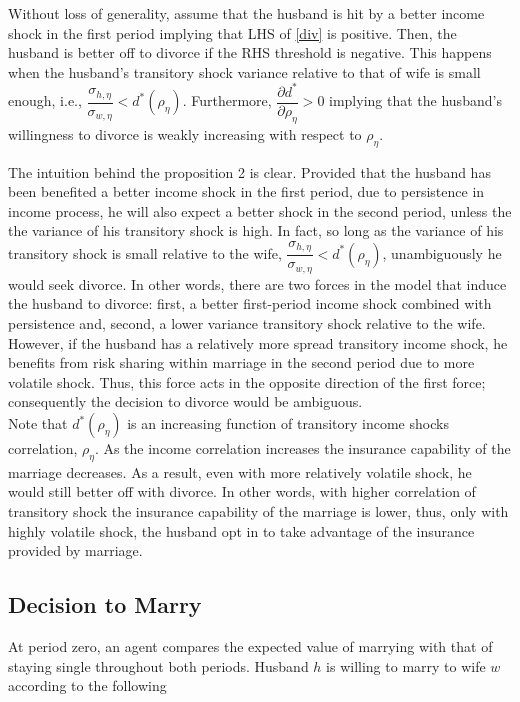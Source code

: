 \begin{prop}
Without loss of generality, assume that the husband is hit by a better income shock in the first period implying that LHS of \eqref{div} is positive. Then, the husband is better off to divorce if the RHS threshold is negative. This happens when the husband's transitory shock variance relative to that of wife is small enough, i.e.,  \( \dfrac{\sigma_{h, \eta}}{\sigma_{w,\eta} } < d^*(\rho_\eta)\). Furthermore,  \( \dfrac{\partial d^*}{\partial \rho_{\eta}} > 0\) implying that the husband's willingness to divorce is weakly increasing with respect to $\rho_\eta$.  
\end{prop}

The intuition behind the proposition 2 is clear. Provided that the husband has been benefited a better income shock in the first period, due to persistence in income process, he will also expect a better shock in the second period, unless the the variance of his transitory shock is high. In fact, so long as the variance of his transitory shock is small relative to the wife,  \( \dfrac{\sigma_{h, \eta}}{\sigma_{w,\eta} } < d^*(\rho_\eta)\), unambiguously he would seek divorce. In other words, there are two forces in the model that induce the husband to divorce: first, a better first-period income shock combined with persistence and, second, a lower variance transitory shock relative to the wife. However, if the husband has a relatively more spread transitory income shock, he benefits from risk sharing within marriage in the second period due to more volatile shock. Thus, this force acts in the opposite direction of the first force; consequently the decision to divorce would be ambiguous.  \\

Note that $d^*(\rho_\eta)$ is an increasing function of transitory income shocks correlation, $\rho_\eta$.  As the income correlation increases the insurance capability of the marriage decreases. As a result, even with more relatively volatile shock, he would still better off with divorce. In other words, with higher correlation of transitory shock the insurance capability of the marriage is lower, thus, only with highly volatile shock, the husband opt in to take advantage of the insurance provided by marriage.     \\


\subsection{Decision to Marry}
 At period zero, an agent compares the expected value of marrying with that of staying single throughout both periods. Husband $h$ is willing to marry to wife $w$ according to the following 

